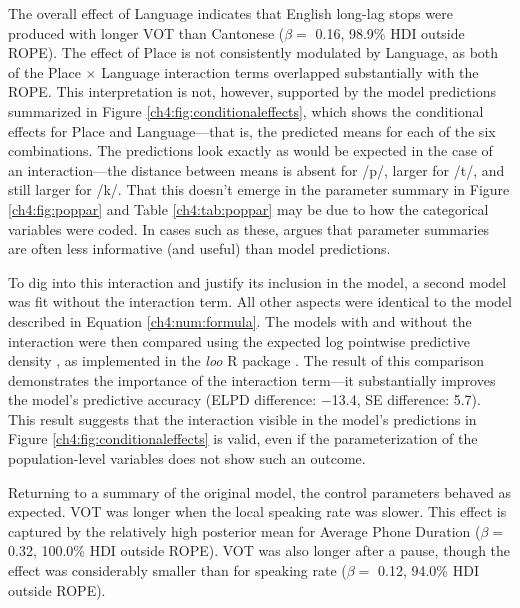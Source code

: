 The overall effect of Language indicates that English long-lag stops were produced with longer VOT than Cantonese ($\beta =$ 0.16, 98.9\% HDI outside ROPE). The effect of Place is not consistently modulated by Language, as both of the Place $\times$ Language interaction terms overlapped substantially with the ROPE. This interpretation is not, however, supported by the model predictions summarized in Figure \ref{ch4:fig:conditionaleffects}, which shows the conditional effects for Place and Language---that is, the predicted means for each of the six combinations. The predictions look exactly as would be expected in the case of an interaction---the distance between means is absent for /p/, larger for /t/, and still larger for /k/. That this doesn't emerge in the parameter summary in Figure \ref{ch4:fig:poppar} and Table \ref{ch4:tab:poppar} may be due to how the categorical variables were coded. In cases such as these, \citet{mcelreath_2020_sr} argues that parameter summaries are often less informative (and useful) than model predictions. 

To dig into this interaction and justify its inclusion in the model, a second model was fit without the interaction term. All other aspects were identical to the model described in Equation \ref{ch4:num:formula}. The models with and without the interaction were then compared using the expected log pointwise predictive density \citep[ELPD][]{vehtari_2017_practical}, as implemented in the \textit{loo} R package \citep{vehtari_2020_loo}. The result of this comparison demonstrates the importance of the interaction term---it substantially improves the model's predictive accuracy (ELPD difference: $-$13.4, SE difference: 5.7). This result suggests that the interaction visible in the model's predictions in Figure \ref{ch4:fig:conditionaleffects} is valid, even if the parameterization of the population-level variables does not show such an outcome. 

Returning to a summary of the original model, the control parameters behaved as expected. VOT was longer when the local speaking rate was slower. This effect is captured by the relatively high posterior mean for Average Phone Duration ($\beta =$ 0.32, 100.0\% HDI outside ROPE). VOT was also longer after a pause, though the effect was considerably smaller than for speaking rate ($\beta =$ 0.12, 94.0\% HDI outside ROPE).

